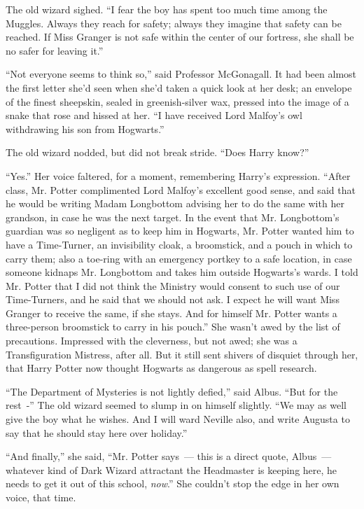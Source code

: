 The old wizard sighed. ``I fear the boy has spent too much time among the Muggles. Always they reach for safety; always they imagine that safety can be reached. If Miss Granger is not safe within the center of our fortress, she shall be no safer for leaving it.''

``Not everyone seems to think so,'' said Professor McGonagall. It had been almost the first letter she'd seen when she'd taken a quick look at her desk; an envelope of the finest sheepskin, sealed in greenish-silver wax, pressed into the image of a snake that rose and hissed at her. ``I have received Lord Malfoy's owl withdrawing his son from Hogwarts.''

The old wizard nodded, but did not break stride. ``Does Harry know?''

``Yes.'' Her voice faltered, for a moment, remembering Harry's expression. ``After class, Mr. Potter complimented Lord Malfoy's excellent good sense, and said that he would be writing Madam Longbottom advising her to do the same with her grandson, in case he was the next target. In the event that Mr. Longbottom's guardian was so negligent as to keep him in Hogwarts, Mr. Potter wanted him to have a Time-Turner, an invisibility cloak, a broomstick, and a pouch in which to carry them; also a toe-ring with an emergency portkey to a safe location, in case someone kidnaps Mr. Longbottom and takes him outside Hogwarts's wards. I told Mr. Potter that I did not think the Ministry would consent to such use of our Time-Turners, and he said that we should not ask. I expect he will want Miss Granger to receive the same, if she stays. And for himself Mr. Potter wants a three-person broomstick to carry in his pouch.'' She wasn't awed by the list of precautions. Impressed with the cleverness, but not awed; she was a Transfiguration Mistress, after all. But it still sent shivers of disquiet through her, that Harry Potter now thought Hogwarts as dangerous as spell research.

``The Department of Mysteries is not lightly defied,'' said Albus. ``But for the rest~-'' The old wizard seemed to slump in on himself slightly. ``We may as well give the boy what he wishes. And I will ward Neville also, and write Augusta to say that he should stay here over holiday.''

``And finally,'' she said, ``Mr. Potter says~--- this is a direct quote, Albus~--- whatever kind of Dark Wizard attractant the Headmaster is keeping here, he needs to get it out of this school, \emph{now}.'' She couldn't stop the edge in her own voice, that time.

